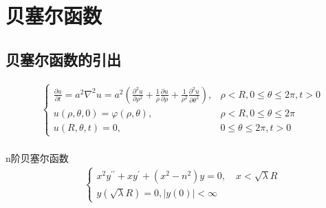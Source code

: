 \chapter{贝塞尔函数}
\section{贝塞尔函数的引出}
\begin{equation}
\begin{aligned}
&\left\{\begin{array}{ll}
{\frac{\partial u}{\partial t}=a^{2} \nabla^{2} u=a^{2}\left(\frac{\partial^{2} u}{\partial \rho^{2}}+\frac{1}{\rho} \frac{\partial u}{\partial \rho}+\frac{1}{\rho^{2}} \frac{\partial^{2} u}{\partial \theta^{2}}\right),} & {\rho<R, 0 \leq \theta \leq 2 \pi, t>0} \\
{u(\rho, \theta, 0)=\varphi(\rho, \theta),} & {\rho<R, 0 \leq \theta \leq 2 \pi} \\
{u(R, \theta, t)=0,} & {0 \leq \theta \leq 2 \pi, t>0}
\end{array}\right.\\
\end{aligned}
\end{equation}\par
n阶贝塞尔函数
\begin{equation}
\begin{aligned}
&\left\{\begin{array}{l}
{x^{2} y^{\prime \prime}+x y^{\prime}+\left(x^{2}-n^{2}\right) y=0, \quad x<\sqrt{\lambda} R} \\
{y(\sqrt{\lambda} R)=0,|y(0)|<\infty}
\end{array}\right.\\
\end{aligned}
\end{equation}

